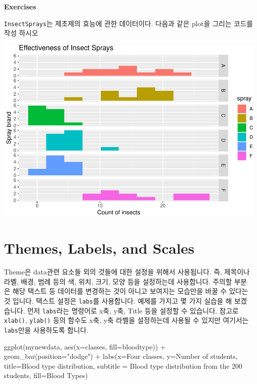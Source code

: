 \documentclass[
]{book}
\newenvironment{Shaded}{\begin{snugshade}}{\end{snugshade}}
\newcommand{\AttributeTok}[1]{\textcolor[rgb]{0.77,0.63,0.00}{#1}}
\newcommand{\FunctionTok}[1]{\textcolor[rgb]{0.00,0.00,0.00}{#1}}
\newcommand{\NormalTok}[1]{#1}
\newcommand{\SpecialCharTok}[1]{\textcolor[rgb]{0.00,0.00,0.00}{#1}}
\newcommand{\StringTok}[1]{\textcolor[rgb]{0.31,0.60,0.02}{#1}}
\begin{document}
\textbf{Exercises}

\texttt{InsectSprays}는 제초제의 효능에 관한 데이터이다. 다음과 같은 plot을 그리는 코드를 작성 하시오

\includegraphics{07-ggplot_files/figure-latex/unnamed-chunk-44-1.pdf}

\hypertarget{themes-labels-and-scales}{%
\section{Themes, Labels, and Scales}\label{themes-labels-and-scales}}

Theme은 data관련 요소들 외의 것들에 대한 설정을 위해서 사용됩니다. 즉, 제목이나 라벨, 배경, 범례 등의 색, 위치, 크기, 모양 등을 설정하는데 사용합니다. 주의할 부분은 해당 택스트 등 데이터를 변경하는 것이 아니고 보여지는 모습만을 바꿀 수 있다는 것 입니다. 택스트 설정은 \texttt{labs}를 사용합니다. 예제를 가지고 몇 가지 실습을 해 보겠습니다. 먼저 \texttt{labs}라는 명령어로 x축, y축, Title 등을 설정할 수 있습니다. 참고로 \texttt{xlab()}, \texttt{ylab()} 등의 함수도 x축, y축 라벨을 설정하는데 사용될 수 있지만 여기서는 \texttt{labs}만을 사용하도록 합니다.

\begin{Shaded}
\begin{Highlighting}[]
\FunctionTok{ggplot}\NormalTok{(mynewdata, }\FunctionTok{aes}\NormalTok{(}\AttributeTok{x=}\NormalTok{classes, }\AttributeTok{fill=}\NormalTok{bloodtype)) }\SpecialCharTok{+}
  \FunctionTok{geom\_bar}\NormalTok{(}\AttributeTok{position=}\StringTok{"dodge"}\NormalTok{) }\SpecialCharTok{+}
  \FunctionTok{labs}\NormalTok{(}\AttributeTok{x=}\StringTok{\textquotesingle{}Four classes\textquotesingle{}}\NormalTok{,}
       \AttributeTok{y=}\StringTok{\textquotesingle{}Number of students\textquotesingle{}}\NormalTok{,}
       \AttributeTok{title=}\StringTok{\textquotesingle{}Blood type distribution\textquotesingle{}}\NormalTok{,}
       \AttributeTok{subtitle =} \StringTok{\textquotesingle{}Blood type distribution from the 200 students\textquotesingle{}}\NormalTok{,}
       \AttributeTok{fill=}\StringTok{\textquotesingle{}Blood Types\textquotesingle{}}\NormalTok{) }
\end{Highlighting}
\end{Shaded}
\end{document}
